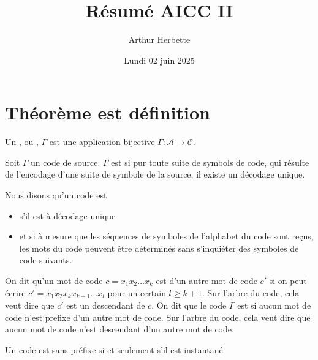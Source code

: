 \documentclass[a4paper]{article}
\title{Résumé AICC II}
\author{Arthur Herbette}
\date{Lundi 02 juin 2025}
\begin{document}
\maketitle
\section{Théorème est définition}

\begin{definition}
Un , ou , $\Gamma$ est une application bijective $\Gamma: \mathcal{A} \to \mathcal{C}$.
\end{definition}
\begin{definition}
Soit $\Gamma$ un code de source. $\Gamma$ est  si pur toute suite de symbols de code, qui résulte de l'encodage d'une suite de symbole de la source, il existe un décodage unique.
\end{definition}
\begin{definition}
Nous disons qu'un code est 
\begin{itemize}
    \item s'il est à décodage unique
    \item et si à mesure que les séquences de symboles de l'alphabet du code sont reçus, les mots du code peuvent être déterminés sans s'inquiéter des symboles de code suivants.
\end{itemize}
\end{definition}
\begin{definition}
    On dit qu'un mot de code $c = x_1x_2\ldots x_k$ est  d'un autre mot de code $c' $ si on peut écrire $c' = x_1x_2x_kx_{k+1}\ldots x_l$ pour un certain $ l \geq k + 1 $. Sur l'arbre du code, cela veut dire que $c'$ est un descendant de $c$. On dit que le code $\Gamma$ est  si aucun mot de code n'est prefixe d'un autre mot de code. Sur l'arbre du code, cela veut dire que aucun mot de code n'est descendant d'un autre mot de code.
\end{definition}
\begin{theoreme}
Un code est sans préfixe si et seulement s'il est instantané
\end{theoreme}
\end{document}
